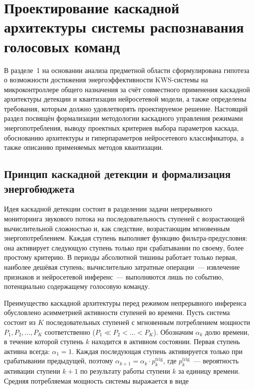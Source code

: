 
\section{Проектирование каскадной архитектуры системы распознавания голосовых команд}

В разделе~1 на основании анализа предметной области сформулирована
гипотеза о возможности достижения энергоэффективности KWS-системы на
микроконтроллере общего назначения за счёт совместного применения
каскадной архитектуры детекции и квантизации нейросетевой модели, а
также определены требования, которым должно удовлетворять проектируемое
решение. Настоящий раздел посвящён формализации методологии каскадного
управления режимами энергопотребления, выводу проектных критериев
выбора параметров каскада, обоснованию архитектуры и гиперпараметров
нейросетевого классификатора, а также описанию применяемых методов
квантизации.

\subsection{Принцип каскадной детекции и формализация энергобюджета}

Идея каскадной детекции состоит в разделении задачи непрерывного
мониторинга звукового потока на последовательность ступеней с
возрастающей вычислительной сложностью и, как следствие, возрастающим
мгновенным энергопотреблением. Каждая ступень выполняет функцию
фильтра-предусловия: она активирует следующую ступень только при
срабатывании по своему, более простому критерию. В периоды абсолютной
тишины работает только первая, наиболее дешёвая ступень; вычислительно
затратные операции~--- извлечение признаков и нейросетевой инференс~---
выполняются лишь по событию, потенциально содержащему голосовую команду.

Преимущество каскадной архитектуры перед режимом непрерывного инференса
обусловлено асимметрией активности ступеней во времени. Пусть система
состоит из $K$ последовательных ступеней с мгновенным потреблением
мощности $P_1, P_2, \ldots, P_K$ соответственно ($P_1 \ll P_2 < \ldots
	< P_K$). Обозначим $\alpha_k$ долю времени, в течение которой ступень
$k$ находится в активном состоянии. Первая ступень активна всегда:
$\alpha_1 = 1$. Каждая последующая ступень активируется только при
срабатывании предыдущей, поэтому $\alpha_{k+1} = \alpha_k \cdot
	p_{k}^{\mathrm{trig}}$, где $p_{k}^{\mathrm{trig}}$~--- вероятность
активации ступени $k+1$ по результату работы ступени $k$ за единицу
времени. Средняя потребляемая мощность системы выражается в виде

